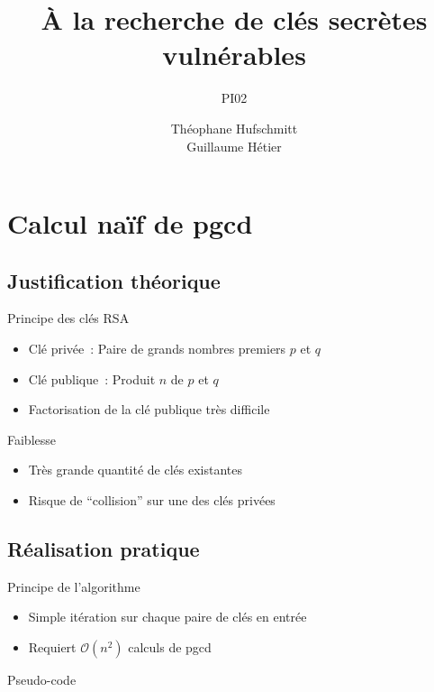 \documentclass{beamer}
\title{À la recherche de clés secrètes vulnérables}
\subtitle{PI02}
\date{}
\author{Théophane Hufschmitt\\Guillaume Hétier}
\begin{document}
\beamerdefaultoverlayspecification{<+->}
\begin{frame}
  \maketitle
\end{frame}

\section{Calcul naïf de pgcd}
\subsection{Justification théorique}
\begin{frame}
  \begin{block}{Principe des clés RSA}
    \begin{itemize}
      \item Clé privée~: Paire de grands nombres premiers $p$ et $q$
      \item Clé publique~: Produit $n$ de $p$ et $q$
      \item Factorisation de la clé publique très difficile
    \end{itemize}
  \end{block}
  \begin{block}{Faiblesse}
    \begin{itemize}
      \item Très grande quantité de clés existantes
      \item Risque de ``collision'' sur une des clés privées
    \end{itemize}
  \end{block}
\end{frame}
\subsection{Réalisation pratique}
\begin{frame}
  \begin{block}{Principe de l'algorithme}
    \begin{itemize}
      \item Simple itération sur chaque paire de clés en entrée
      \item Requiert $\mathcal{O}(n^2)$ calculs de pgcd
    \end{itemize}
  \end{block}  
  \begin{block}{Pseudo-code}
    \begin{algorithm}[H]
    \end{algorithm}
  \end{block}
\end{frame}
\end{document}
